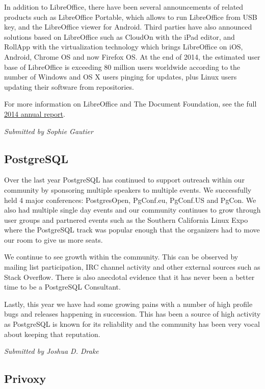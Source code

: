 \documentclass[letterpaper]{report}
\begin{document}
In addition to LibreOffice, there have been several announcements of
related products such as LibreOffice Portable, which allows to run
LibreOffice from USB key, and the LibreOffice viewer for Android. Third
parties have also announced solutions based on LibreOffice such as CloudOn
with the iPad editor, and RollApp with the virtualization technology which
brings LibreOffice on iOS, Android, Chrome OS and now Firefox OS. At the
end of 2014, the estimated user base of LibreOffice is exceeding 80 million
users worldwide according to the number of Windows and OS X users pinging
for updates, plus Linux users updating their software from repositories.

For more information on LibreOffice and The Document Foundation, see the
full
\href{https://wiki.documentfoundation.org/File:TDF2014AnnualReport.pdf}{2014
annual report}.

{\em Submitted by Sophie Gautier}

\subsection{PostgreSQL}

Over the last year PostgreSQL has continued to support outreach within our
community by sponsoring multiple speakers to multiple events. We
successfully held 4 major conferences: PostgresOpen, PgConf.eu, PgConf.US
and PgCon. We also had multiple single day events and our community
continues to grow through user groups and partnered events such as the
Southern California Linux Expo where the PostgreSQL track was popular
enough that the organizers had to move our room to give us more seats.

We continue to see growth within the community. This can be observed by
mailing list participation, IRC channel activity and other external sources
such as Stack Overflow. There is also anecdotal evidence that it has never
been a better time to be a PostgreSQL Consultant.

Lastly, this year we have had some growing pains with a number of high
profile bugs and releases happening in succession. This has been a source
of high activity as PostgreSQL is known for its reliability and the
community has been very vocal about keeping that reputation.

{\em Submitted by Joshua D. Drake}

\subsection{Privoxy}
\end{document}
